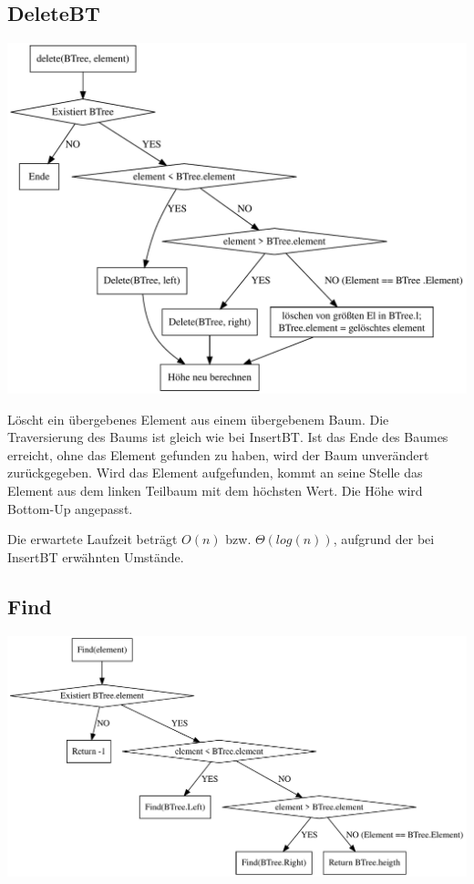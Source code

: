 \documentclass[11pt]{article}
\begin{document}
    \subsection{DeleteBT}\label{subsec:deletebt}

    \begin{center}
        \includegraphics[width=0.8\columnwidth] {delete}
    \end{center}

    Löscht ein übergebenes Element aus einem übergebenem Baum.
    Die Traversierung des Baums ist gleich wie bei InsertBT.
    Ist das Ende des Baumes erreicht, ohne das Element gefunden zu haben,
    wird der Baum unverändert zurückgegeben.
    Wird das Element aufgefunden,
    kommt an seine Stelle das Element aus dem linken Teilbaum mit dem höchsten Wert.
    Die Höhe wird Bottom-Up angepasst.

    Die erwartete Laufzeit beträgt
    \begin{math}
        O(n)
    \end {math}
    bzw.
    \begin{math}
        \Theta (log (n))
    \end{math},
    aufgrund der bei InsertBT erwähnten Umstände.

    \subsection{Find}\label{subsec:find}

    \begin{center}
        \includegraphics[width=1.1\columnwidth] {find.pdf}
    \end{center}
\end{document}
